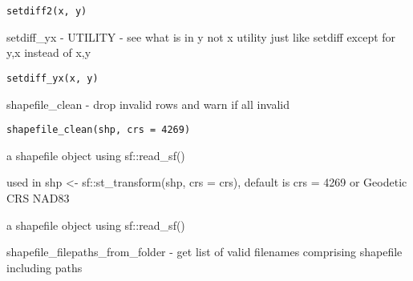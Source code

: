 \documentclass[a4paper]{book}
\begin{document}
%
\begin{Usage}
\begin{verbatim}
setdiff2(x, y)
\end{verbatim}
\end{Usage}
%
\begin{Description}\relax
setdiff\_yx - UTILITY - see what is in y not x
utility just like setdiff except for y,x instead of x,y
\end{Description}
%
\begin{Usage}
\begin{verbatim}
setdiff_yx(x, y)
\end{verbatim}
\end{Usage}
%
\begin{Description}\relax
shapefile\_clean  -  drop invalid rows and warn if all invalid
\end{Description}
%
\begin{Usage}
\begin{verbatim}
shapefile_clean(shp, crs = 4269)
\end{verbatim}
\end{Usage}
%
\begin{Arguments}
\begin{ldescription}
\item[\code{shp}] a shapefile object using sf::read\_sf()

\item[\code{crs}] used in shp <- sf::st\_transform(shp, crs = crs), default is crs = 4269 or Geodetic CRS NAD83
\end{ldescription}
\end{Arguments}
%
\begin{Value}
a shapefile object using sf::read\_sf()
\end{Value}
%
\begin{SeeAlso}\relax
{}
\end{SeeAlso}
%
\begin{Description}\relax
shapefile\_filepaths\_from\_folder  -  get list of valid filenames comprising shapefile including paths
\end{Description}
\end{document}
